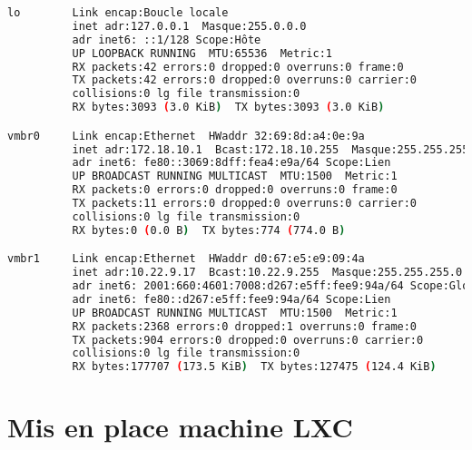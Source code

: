 \documentclass[french]{article}
\begin{document}
\begin{lstlisting}[language=bash,caption={}]
lo        Link encap:Boucle locale  
          inet adr:127.0.0.1  Masque:255.0.0.0
          adr inet6: ::1/128 Scope:Hôte
          UP LOOPBACK RUNNING  MTU:65536  Metric:1
          RX packets:42 errors:0 dropped:0 overruns:0 frame:0
          TX packets:42 errors:0 dropped:0 overruns:0 carrier:0
          collisions:0 lg file transmission:0 
          RX bytes:3093 (3.0 KiB)  TX bytes:3093 (3.0 KiB)

vmbr0     Link encap:Ethernet  HWaddr 32:69:8d:a4:0e:9a  
          inet adr:172.18.10.1  Bcast:172.18.10.255  Masque:255.255.255.0
          adr inet6: fe80::3069:8dff:fea4:e9a/64 Scope:Lien
          UP BROADCAST RUNNING MULTICAST  MTU:1500  Metric:1
          RX packets:0 errors:0 dropped:0 overruns:0 frame:0
          TX packets:11 errors:0 dropped:0 overruns:0 carrier:0
          collisions:0 lg file transmission:0 
          RX bytes:0 (0.0 B)  TX bytes:774 (774.0 B)

vmbr1     Link encap:Ethernet  HWaddr d0:67:e5:e9:09:4a  
          inet adr:10.22.9.17  Bcast:10.22.9.255  Masque:255.255.255.0
          adr inet6: 2001:660:4601:7008:d267:e5ff:fee9:94a/64 Scope:Global
          adr inet6: fe80::d267:e5ff:fee9:94a/64 Scope:Lien
          UP BROADCAST RUNNING MULTICAST  MTU:1500  Metric:1
          RX packets:2368 errors:0 dropped:1 overruns:0 frame:0
          TX packets:904 errors:0 dropped:0 overruns:0 carrier:0
          collisions:0 lg file transmission:0 
          RX bytes:177707 (173.5 KiB)  TX bytes:127475 (124.4 KiB)

\end{lstlisting}
\newpage
\section{Mis en place machine LXC}
\end{document}
